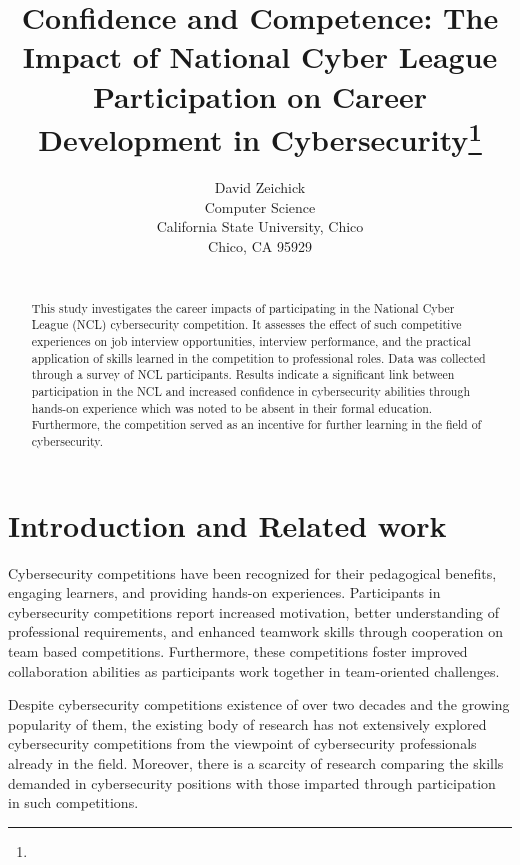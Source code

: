 \documentclass{article}
\title{Confidence and Competence: The Impact of National Cyber League Participation on Career Development in Cybersecurity\footnote{\protect}
}
\author{
David Zeichick \\
Computer Science\\
California State University, Chico\\
Chico, CA 95929\\
\email{dzeichick@csuchico.edu}\\
}
\begin{document}
\maketitle
\thispagestyle{empty}
\pagestyle{empty}

\begin{abstract}
This study investigates the career impacts of participating in the National Cyber League (NCL) cybersecurity competition. It assesses the effect of such competitive experiences on job interview opportunities, interview performance, and the practical application of skills learned in the competition to professional roles. Data was collected through a survey of NCL participants. Results indicate a significant link between participation in the NCL and increased confidence in cybersecurity abilities through hands-on experience which was noted to be absent in their formal education. Furthermore, the competition served as an incentive for further learning in the field of cybersecurity.
\end{abstract}

\section{Introduction and Related work}

Cybersecurity competitions have been recognized for their pedagogical benefits, engaging learners, and providing hands-on experiences\cite{chothia2015offline,katsantonis2017conceptual,de2018adles}. Participants in cybersecurity competitions report increased motivation, better understanding of professional requirements, and enhanced teamwork skills through cooperation on team based competitions\cite{3gse15,dark2014advancing,vigna2014ten}. Furthermore, these competitions foster improved collaboration abilities as participants work together in team-oriented challenges\cite{gotel2009global}. 

Despite cybersecurity competitions existence of over two decades and the growing popularity of them, the existing body of research has not extensively explored cybersecurity competitions from the viewpoint of cybersecurity professionals already in the field\cite{chothia2015offline}. Moreover, there is a scarcity of research comparing the skills demanded in cybersecurity positions with those imparted through participation in such competitions\cite{soups16}.
\end{document}
